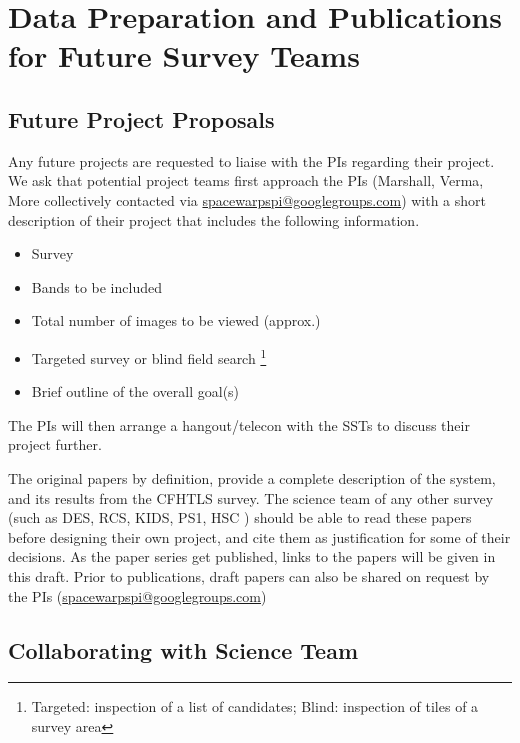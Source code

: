 \documentclass[a4paper]{article}
\begin{document}

\section{Data Preparation and Publications for Future Survey Teams}
\label{sec:series}

\subsection{Future Project Proposals}
Any future \sw projects are requested to liaise with the PIs regarding their project. We ask that potential project teams first approach the \sw PIs (Marshall, Verma, More collectively contacted via \href{mailto:spacewarpspi@googlegroups.com}{spacewarpspi@googlegroups.com}) with a short description of their project that includes the following information.

\begin{itemize}
\item Survey
\item Bands to be included
\item Total number of images to be viewed (approx.)
\item Targeted survey or blind field search \footnote{Targeted: inspection of a list of candidates; Blind: inspection of tiles of a survey area}
\item Brief outline of the overall goal(s) 
\end{itemize}

The \sw PIs will then arrange a hangout/telecon with the SSTs to discuss their project further.

The original \sw papers by definition, provide a complete description of the system, and its results from the CFHTLS survey. The science team of
any other survey (such as DES, RCS, KIDS, PS1, HSC \etc) should be able
to read these papers before designing their own \sw project, and cite them as justification for some of their decisions. As the \sw paper series get published, links to the papers will be given in this draft. Prior to publications, draft papers can also be shared on request by the \sw PIs (\href{mailto:spacewarpspi@googlegroups.com}{spacewarpspi@googlegroups.com})

\subsection{Collaborating with \sw Science Team}
\end{document}
